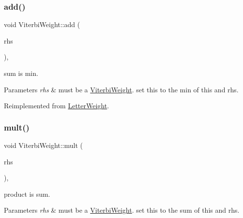 \subsubsection{\texorpdfstring{add()}{add()}\hspace{0.1cm}{\footnotesize\ttfamily [4/5]}}
{\footnotesize\ttfamily void Viterbi\+Weight\+::add (\begin{DoxyParamCaption}\item[{const \mbox{\hyperlink{classLetterWeight}{Letter\+Weight}} $\ast$}]{rhs }\end{DoxyParamCaption})\hspace{0.3cm}{\ttfamily [protected]}, {\ttfamily [virtual]}}



sum is min. 


\begin{DoxyParams}{Parameters}
{\em rhs} & must be a \mbox{\hyperlink{classViterbiWeight}{Viterbi\+Weight}}. set this to the min of this and rhs. \\
\hline
\end{DoxyParams}


Reimplemented from \mbox{\hyperlink{group__weight_ga49b09c8f364a2ebf1d154f606d9aaea8}{Letter\+Weight}}.

\mbox{\label{group__weight_ga842377ca8ad5fa73cc9787fa97e88635}} 
\subsubsection{\texorpdfstring{mult()}{mult()}\hspace{0.1cm}{\footnotesize\ttfamily [4/5]}}
{\footnotesize\ttfamily void Viterbi\+Weight\+::mult (\begin{DoxyParamCaption}\item[{const \mbox{\hyperlink{classLetterWeight}{Letter\+Weight}} $\ast$}]{rhs }\end{DoxyParamCaption})\hspace{0.3cm}{\ttfamily [protected]}, {\ttfamily [virtual]}}



product is sum. 


\begin{DoxyParams}{Parameters}
{\em rhs} & must be a \mbox{\hyperlink{classViterbiWeight}{Viterbi\+Weight}}. set this to the sum of this and rhs. \\
\hline
\end{DoxyParams}



